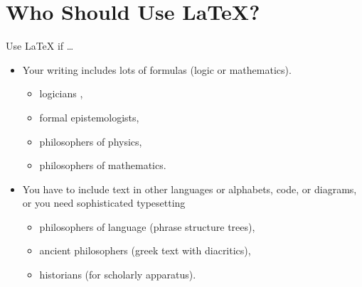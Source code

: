 \section{Who Should Use \LaTeX{}?}


\begin{frame}{Use \LaTeX{} if \dots }

\begin{itemize}
\item Your writing includes lots of formulas (logic or mathematics). 
  \begin{itemize}
  \item logicians ,
  \item formal epistemologists,
  \item philosophers of physics,
  \item philosophers of mathematics.
  \end{itemize}

\item You have to include text in other languages or alphabets, code,
or diagrams, or you need sophisticated typesetting 
\begin{itemize}
\item philosophers of language (phrase structure trees),
\item ancient philosophers (greek text with diacritics),
\item historians (for scholarly apparatus).
\end{itemize}

\end{itemize}

\end{frame}

